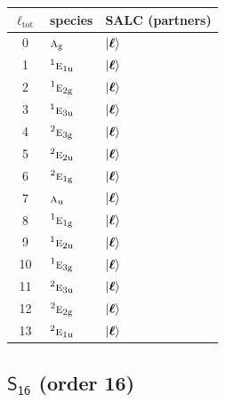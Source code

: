 \documentclass[11pt]{article}
\newcommand{\grp}[1]{\mathsf{#1}}
\newcommand{\irr}[1]{\text{\normalfont\scshape #1}}
\newcommand{\conjpair}[1]{{}^{#1}}
\newcommand{\ptag}[1]{\mathrm{#1}}
\begin{document}
\begin{longtable}{c l l}\hline $\ell_{\mathrm{tot}}$ & species & SALC (partners)\\ \hline\endhead

0 & $\irr{a}_{\ptag{g}}$ & $\ket{\boldsymbol\ell}$\\

1 & $\conjpair{1}\irr{e}_{1\ptag{u}}$ & $\ket{\boldsymbol\ell}$\\

2 & $\conjpair{1}\irr{e}_{2\ptag{g}}$ & $\ket{\boldsymbol\ell}$\\

3 & $\conjpair{1}\irr{e}_{3\ptag{u}}$ & $\ket{\boldsymbol\ell}$\\

4 & $\conjpair{2}\irr{e}_{3\ptag{g}}$ & $\ket{\boldsymbol\ell}$\\

5 & $\conjpair{2}\irr{e}_{2\ptag{u}}$ & $\ket{\boldsymbol\ell}$\\

6 & $\conjpair{2}\irr{e}_{1\ptag{g}}$ & $\ket{\boldsymbol\ell}$\\

7 & $\irr{a}_{\ptag{u}}$ & $\ket{\boldsymbol\ell}$\\

8 & $\conjpair{1}\irr{e}_{1\ptag{g}}$ & $\ket{\boldsymbol\ell}$\\

9 & $\conjpair{1}\irr{e}_{2\ptag{u}}$ & $\ket{\boldsymbol\ell}$\\

10 & $\conjpair{1}\irr{e}_{3\ptag{g}}$ & $\ket{\boldsymbol\ell}$\\

11 & $\conjpair{2}\irr{e}_{3\ptag{u}}$ & $\ket{\boldsymbol\ell}$\\

12 & $\conjpair{2}\irr{e}_{2\ptag{g}}$ & $\ket{\boldsymbol\ell}$\\

13 & $\conjpair{2}\irr{e}_{1\ptag{u}}$ & $\ket{\boldsymbol\ell}$\\

\hline\end{longtable}

\subsection*{$\grp{S_{16}}$ \quad (order 16)}
\end{document}
